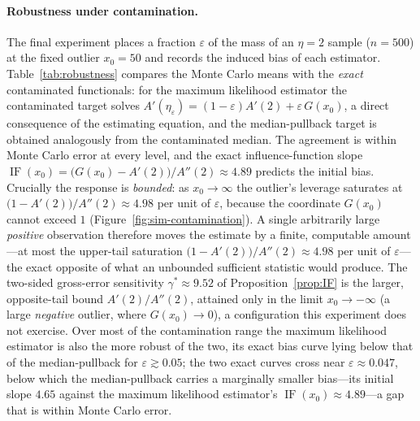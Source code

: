 \documentclass[11pt]{article}
\theoremstyle{definition}
\newcommand{\IF}{\operatorname{IF}}
\begin{document}
\paragraph{Robustness under contamination.}
The final experiment places a fraction $\varepsilon$ of the mass of an
$\eta=2$ sample ($n=500$) at the fixed outlier $x_0=50$ and records the
induced bias of each estimator. Table~\ref{tab:robustness} compares the
Monte Carlo means with the \emph{exact} contaminated functionals: for the
maximum likelihood estimator the contaminated target solves
$A'(\eta_\varepsilon)=(1-\varepsilon)A'(2)+\varepsilon\,G(x_0)$, a direct
consequence of the estimating equation, and the median-pullback target is
obtained analogously from the contaminated median. The agreement is within
Monte Carlo error at every level, and the exact influence-function slope
$\IF(x_0)=\bigl(G(x_0)-A'(2)\bigr)/A''(2)\approx4.89$ predicts the initial
bias. Crucially the response is \emph{bounded}: as $x_0\to\infty$ the
outlier's leverage saturates at $\bigl(1-A'(2)\bigr)/A''(2)\approx4.98$ per
unit of $\varepsilon$, because the coordinate $G(x_0)$ cannot exceed $1$
(Figure~\ref{fig:sim-contamination}). A single arbitrarily large
\emph{positive} observation therefore moves the estimate by a finite,
computable amount---at most the upper-tail saturation
$\bigl(1-A'(2)\bigr)/A''(2)\approx4.98$ per unit of $\varepsilon$---the
exact opposite of what an unbounded sufficient statistic would produce. The
two-sided gross-error sensitivity $\gamma^*\approx9.52$ of
Proposition~\ref{prop:IF} is the larger, opposite-tail bound $A'(2)/A''(2)$,
attained only in the limit $x_0\to-\infty$ (a large \emph{negative} outlier,
where $G(x_0)\to0$), a configuration this experiment does not exercise. Over
most of the contamination range the maximum likelihood estimator is also the
more robust of the two, its exact bias curve lying below that of the
median-pullback for $\varepsilon\gtrsim0.05$; the two exact curves cross near
$\varepsilon\approx0.047$, below which the median-pullback carries a
marginally smaller bias---its initial slope $4.65$ against the maximum
likelihood estimator's $\IF(x_0)\approx4.89$---a gap that is within Monte
Carlo error.
\end{document}
